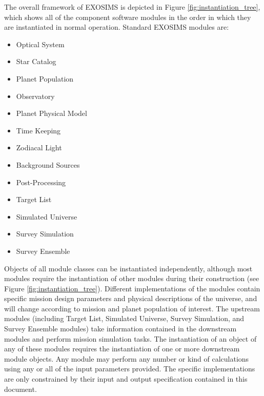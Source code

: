 \documentclass[cleanfoot]{asme2ej}
\newcommand{\reffig}[1]{Figure \ref{#1}}
\begin{document}
The overall framework of EXOSIMS is depicted in \reffig{fig:instantiation_tree}, which shows all of the component software modules in the order in which they are instantiated in normal operation. Standard EXOSIMS modules are:
\begin{itemize}
    \item Optical System
    \item Star Catalog
    \item Planet Population
    \item Observatory
    \item Planet Physical Model
    \item Time Keeping
    \item Zodiacal Light
    \item Background Sources
    \item Post-Processing 
    \item Target List
    \item Simulated Universe
    \item Survey Simulation
    \item Survey Ensemble
\end{itemize}  

Objects of all module classes can be instantiated independently, although most modules require the instantiation of other modules during their construction (see \reffig{fig:instantiation_tree}). Different implementations of the modules contain specific mission design parameters and physical descriptions of the universe, and will change according to mission and planet population of interest.  The upstream modules (including Target List, Simulated Universe, Survey Simulation, and Survey Ensemble modules) take information contained in the downstream modules and perform mission simulation tasks. The instantiation of an object of any of these modules requires the instantiation of one or more downstream module objects.  Any module may perform any number or kind of calculations using any or all of the input parameters provided.  The specific implementations are only constrained by their input and output specification contained in this document.
\end{document}
